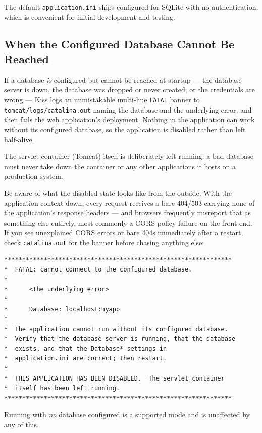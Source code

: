 \begin{notebox}
The default \texttt{application.ini} ships configured for SQLite with no authentication, which is convenient for initial development and testing.
\end{notebox}

\subsection{When the Configured Database Cannot Be Reached}
\label{sec:config-db-unreachable}

If a database \emph{is} configured but cannot be reached at startup --- the database server is down, the database was dropped or never created, or the credentials are wrong --- Kiss logs an unmistakable multi-line \texttt{FATAL} banner to \texttt{tomcat/logs/catalina.out} naming the database and the underlying error, and then fails the web application's deployment.  Nothing in the application can work without its configured database, so the application is disabled rather than left half-alive.

The servlet container (Tomcat) itself is deliberately left running: a bad database must never take down the container or any other applications it hosts on a production system.

Be aware of what the disabled state looks like from the outside.  With the application context down, every request receives a bare 404/503 carrying none of the application's response headers --- and browsers frequently misreport that as something else entirely, most commonly a CORS policy failure on the front end.  If you see unexplained CORS errors or bare 404s immediately after a restart, check \texttt{catalina.out} for the banner before chasing anything else:

\begin{lstlisting}[style=shell]
***************************************************************
*  FATAL: cannot connect to the configured database.
*
*      <the underlying error>
*
*      Database: localhost:myapp
*
*  The application cannot run without its configured database.
*  Verify that the database server is running, that the database
*  exists, and that the Database* settings in
*  application.ini are correct; then restart.
*
*  THIS APPLICATION HAS BEEN DISABLED.  The servlet container
*  itself has been left running.
***************************************************************
\end{lstlisting}

\noindent
Running with \emph{no} database configured is a supported mode and is unaffected by any of this.

